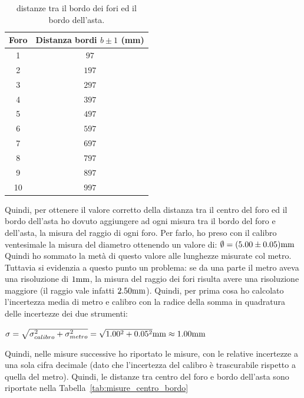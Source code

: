\documentclass[a4paper,12pt]{article}
\begin{document}
\begin{table}[h!]
\centering
\begin{tabular}{c c}
     \toprule
     Foro  & Distanza bordi $b\pm1$ (mm) \\
     \midrule
    1 &  $97$\\
    2 &  $197$\\
    3 &  $297$\\
    4 &  $397$\\
    5 &  $497$\\
    6 &  $597$\\
    7 &  $697$\\
    8 &  $797$\\
    9 &  $897$\\
    10 & $997$\\
     \bottomrule
  \end{tabular}
  \caption{distanze tra il bordo dei fori ed il bordo dell'asta.}\label{tab:misure_bordo_bordo}
\end{table}

Quindi, per ottenere il valore corretto della distanza tra il centro del foro ed il bordo dell'asta ho dovuto aggiungere ad ogni misura tra il bordo del foro e dell'asta, la misura del raggio di ogni foro. Per farlo, ho preso con il calibro ventesimale la misura del diametro ottenendo un valore di: $\emptyset=(5.00\pm0.05)\rm mm$\\
Quindi ho sommato la metà di questo valore alle lunghezze misurate col metro. Tuttavia si evidenzia a questo punto un problema: se da una parte il metro aveva una risoluzione di $1\rm mm$, la misura del raggio dei fori risulta avere una risoluzione maggiore (il raggio vale infatti $2.50\rm mm$). Quindi, per prima cosa ho calcolato l'incertezza media di metro e calibro con la radice della somma in quadratura delle incertezze dei due strumenti:
\begin{center}
    $\sigma =\sqrt{\sigma_{calibro}^2+\sigma_{metro}^2}=\sqrt{1.00^2+0.05^2}\rm mm\approx1.00mm$
\end{center}
Quindi, nelle misure successive ho riportato le misure, con le relative incertezze a una sola cifra decimale (dato che l'incertezza del calibro è trascurabile rispetto a quella del metro).
Quindi, le distanze tra centro del foro e bordo dell'asta sono riportate nella Tabella~\ref{tab:misure_centro_bordo}\\%
\end{document}
